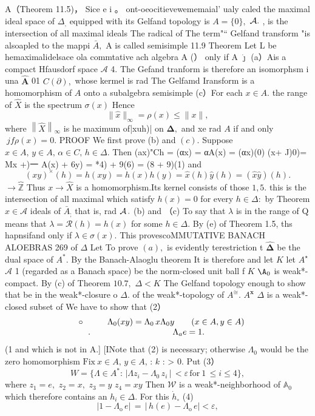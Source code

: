 A（Theorem 11.5)， Sice e i 。 ont-oeocitievewememaial' ualy caled the maximal ideal space of $\textstyle\Delta_{\mathrm{{,}}}$ equipped with its Gelfand topology is $A=\{0\},$ ${\cal A}.$ , is the intersection of all maximal ideals The radical of The term"“ Gelfand transform "is alsoapled to the mappi ${\bar{A}},$ A is called semisimple 11.9 Theorem Let L be hemaximalidelsace ola commtative ach algebra A (） only if A $\dot{\boldsymbol{\jmath}}$ (a）Ais a compact Hfausdorf space $\textstyle{\mathcal{A}}$ 4. The Gefand tranform is therefore an isomorphsm i una $\hat{\mathbf{A}}$ 01 $C(\partial),$ whose kermel is rad The Gelfamd Iransform is a homomorphism of $\textstyle A$ onto a subalgebra semisimple (c）For each $x\in A.$ the range of ${\hat{X}}$ is the spectrum $\sigma(x)$ Hence $$ \|{\hat{x}}\|_{\infty}=\rho(x)\leq\|x\|, $$ where $\left\|{\hat{X}}\right\|_{\infty}$ is he maximum of|xuh)| on ${\boldsymbol{\Delta}},$ and xe rad $\scriptstyle A$ if and only $~j f\rho(x)=0.$ PROOF We first prove (b) and $(c).$ Suppose $x\in A,\,y\in A,\,\alpha\in C,\,h\in\Delta.$ Then (ax)"Ch = (αx) = αA(x) = (αx)(0) (x+ J)0)= Mx +)一 A(x) + 6y) = *4) + 9(6) = (8 + 9)(1) and $$ (x y)^{\times}(h)=h(x y)=h(x)h(y)={\hat{x}}(h){\hat{y}}(h)=({\hat{x}}{\hat{y}})(h). $$ $\longrightarrow\overbrace{\mathbb{Z}}$ Thus $x\to{\hat{X}}$ is a homomorphism.Its kernel consists of those $\scriptstyle1,5.$ this is the intersection of all maximal which satisfy $h(x)=0$ for every $h\in\Delta\colon$ by Theorem $x\in{\mathcal{A}}$ ideals of ${\bar{A}}_{;}$ that is, rad ${\cal A}\,.$ (b) and （c) To say that $\lambda$ is in the range of Q means that $\lambda={\mathcal{R}}(h)=h(x)$ for some $h\in\Delta.$ By (e) of Theorem 1.5, ths hapnsifand only if $\lambda\in\sigma(x).$ This provescoMMUTATIVE BANACH ALOEBRAS 269 of $\Delta$ Let To prove $(a),$ is evidently terestriction t $\hat{\boldsymbol{\Delta}}$ be the dual space of $A^{\ast}.$ By the Banach-Alaoglu theorem It is therefore and let $\textstyle K$ let $A^{\star}$ $\textstyle{\mathcal{A}}$ 1 (regarded as a Banach space) be the norm-closed unit ball f $\textstyle K$ $\mathrm{\A}_{0}$ is weak*-compact. By (c) of Theorem $10.7,$ $\Delta<K$ The Gelfand topology enough to show that be in the weak*-closure o $\Delta.$ of the weak*-topology of $A^{\cong}.$ $A^{\textbf{x}}$ $\Delta$ is a weak*-closed subset of We have to show that (2） $$ \begin{array}{c c c}{{\circ}}&{{\quad\Lambda_{0}(x y)=\Lambda_{0}\,x\Lambda_{0}y\qquad(x\in A,y\in A)}}\\ {{\qquad.}}&{{\qquad\qquad\Lambda_{a}e=1.}}\end{array} $$ (1 and which is not in A.] [INote that (2) is necessary; otherwise $\Lambda_{0}$ would be the zero homomorphism ${\mathrm{Fix~}}x\in A,\,y\in A,\,:\,k$ : > 0. Put (3） $$ W=\{\Lambda\in A^{*}\!:\,|\Lambda z_{i}-\Lambda_{0}\,z_{i}\,|\,<\varepsilon\,{\mathrm{for~}}1\,\leq i\leq4\}, $$ where $z_{1}=e,$ $z_{2}=x,$ $z_{3}=y$ $z_{4}=x y$ Then ${\mathcal{W}}$ is a weak*-neighborhood of $\mathbb{A}_{0}$ which therefore contains an $h_{i}\in\Delta.$ For this ${\dot{h}}_{\circ}$ (4) $$ |1-\Lambda_{\mathrm{o}}\,e|\,=\,|\,h(e)-\Lambda_{\mathrm{o}}\,e|<\varepsilon, $$ 